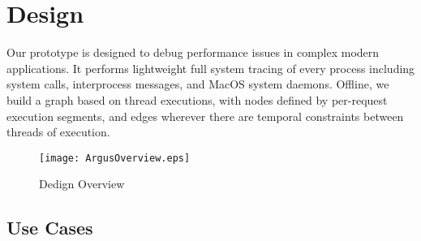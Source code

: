 \section{Design}
\label{sec:design}

Our \xxx prototype is designed to debug performance issues in complex modern applications.
It performs lightweight full system tracing of every process including system calls, interprocess messages, and MacOS system daemons.
Offline, we build a graph based on thread executions, with nodes defined by per-request execution segments, and edges wherever there are temporal constraints between threads of execution.

\begin{figure}[tb]
    \centering
    \texttt{[image: ArgusOverview.eps]}
    \caption{Dedign Overview}
    \label{fig:argus-overview}
\end{figure}

\subsection{Use Cases}

